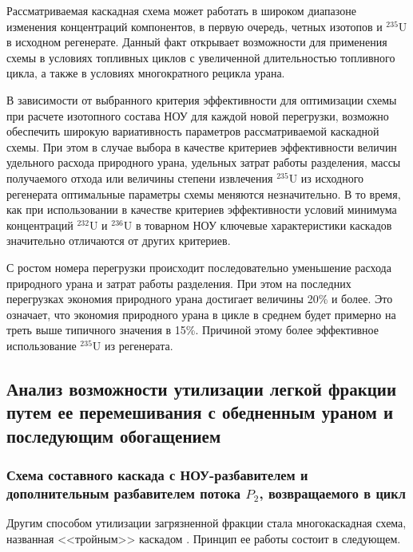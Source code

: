 Рассматриваемая каскадная схема может работать в широком диапазоне изменения концентраций компонентов, в первую очередь, четных изотопов и $^{235}$U в исходном регенерате. Данный факт открывает возможности для применения схемы в условиях топливных циклов с увеличенной длительностью топливного цикла, а также в условиях многократного рецикла урана.

В зависимости от выбранного критерия эффективности для оптимизации схемы при расчете изотопного состава НОУ для каждой новой перегрузки, возможно обеспечить широкую вариативность параметров рассматриваемой каскадной схемы. При этом в случае выбора в качестве критериев эффективности величин удельного расхода природного урана, удельных затрат работы разделения, массы получаемого отхода или величины степени извлечения $^{235}$U из исходного регенерата оптимальные параметры схемы меняются незначительно. В то время, как при использовании в качестве критериев эффективности условий минимума концентраций $^{232}$U и $^{236}$U в товарном НОУ ключевые характеристики каскадов значительно отличаются от других критериев.

С ростом номера перегрузки происходит последовательно уменьшение расхода природного урана и затрат работы разделения. При этом на последних перегрузках экономия природного урана достигает величины 20\% и более. Это означает, что экономия природного урана в цикле в среднем будет примерно на треть выше типичного значения в 15\%. Причиной этому более эффективное использование $^{235}$U из регенерата.




\subsection{Анализ возможности утилизации легкой фракции путем ее перемешивания с обедненным ураном и последующим обогащением}

\subsubsection{Схема составного каскада с НОУ-разбавителем и дополнительным разбавителем потока $P_2$, возвращаемого в цикл}

Другим способом утилизации загрязненной фракции стала многокаскадная схема, названная <<тройным>> каскадом \cite{smirnovApplyingEnrichmentCapacities2018}. Принцип ее работы состоит в следующем.

